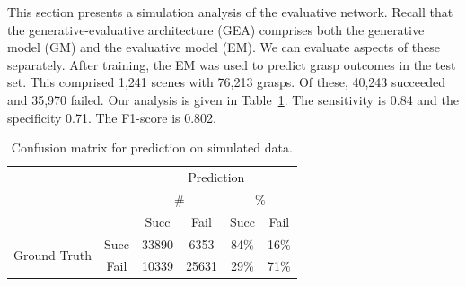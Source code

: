This section presents a simulation analysis of the evaluative network. Recall that the generative-evaluative architecture (GEA) comprises both the generative model (GM) and the evaluative model (EM). We can evaluate aspects of these separately. After training, the EM was used to predict grasp outcomes in the test set. This comprised 1,241 scenes with 76,213 grasps. Of these, 40,243 succeeded and 35,970 failed. Our analysis is given in Table~\ref{fig:predictions}. The sensitivity is 0.84 and the specificity 0.71. The F1-score is 0.802.
\begin{table}[b]
\centering
\caption{Confusion matrix for prediction on simulated data.}
\label{fig:predictions}
\begin{tabular}{|c|c|c|c|c|c|}
\hline
 & & \multicolumn{4}{c|}{Prediction} \\ \cline{3-6}
      & & \multicolumn{2}{c|}{\#} & \multicolumn{2}{c|}{\%} \\ \cline{3-6}
  &  & Succ         & Fail         & Succ         & Fail         \\ \hline
\multirow{ 2}{*}{Ground Truth} \newline & Succ & 33890      & 6353       & 84\%     & 16\%       \\ \cline{2-6}
 &Fail & 10339      &  25631    & 29\%     &  71\%   \\ \hline
\end{tabular}
\end{table}


